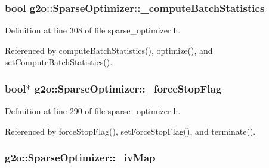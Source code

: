\subsubsection[{\texorpdfstring{\+\_\+compute\+Batch\+Statistics}{_computeBatchStatistics}}]{\setlength{\rightskip}{0pt plus 5cm}bool g2o\+::\+Sparse\+Optimizer\+::\+\_\+compute\+Batch\+Statistics\hspace{0.3cm}{\ttfamily [protected]}}\hypertarget{classg2o_1_1SparseOptimizer_a3bd44c498c4d983c092f23673de14d5d}{}\label{classg2o_1_1SparseOptimizer_a3bd44c498c4d983c092f23673de14d5d}


Definition at line 308 of file sparse\+\_\+optimizer.\+h.



Referenced by compute\+Batch\+Statistics(), optimize(), and set\+Compute\+Batch\+Statistics().

\subsubsection[{\texorpdfstring{\+\_\+force\+Stop\+Flag}{_forceStopFlag}}]{\setlength{\rightskip}{0pt plus 5cm}bool$\ast$ g2o\+::\+Sparse\+Optimizer\+::\+\_\+force\+Stop\+Flag\hspace{0.3cm}{\ttfamily [protected]}}\hypertarget{classg2o_1_1SparseOptimizer_aac4a9f9b7d875ee40cae55f98d3437ab}{}\label{classg2o_1_1SparseOptimizer_aac4a9f9b7d875ee40cae55f98d3437ab}


Definition at line 290 of file sparse\+\_\+optimizer.\+h.



Referenced by force\+Stop\+Flag(), set\+Force\+Stop\+Flag(), and terminate().

\subsubsection[{\texorpdfstring{\+\_\+iv\+Map}{_ivMap}}]{ g2o\+::\+Sparse\+Optimizer\+::\+\_\+iv\+Map\hspace{0.3cm}{\ttfamily [protected]}}\hypertarget{classg2o_1_1SparseOptimizer_a488b95a90a61454c787e9c13458e510b}{}\label{classg2o_1_1SparseOptimizer_a488b95a90a61454c787e9c13458e510b}


